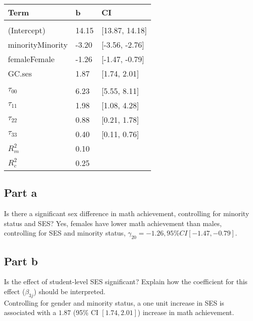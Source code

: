 \documentclass[]{article}
\begin{document}
\begin{table}[H]
\centering
\begin{tabular}{lll}
\toprule
Term & b & CI\\
\midrule
\addlinespace[0.3em]
\multicolumn{3}{l}{\textbf{Fixed}}\\
\hspace{1em}(Intercept) & 14.15 & [13.87, 14.18]\\
\hspace{1em}minorityMinority & -3.20 & [-3.56, -2.76]\\
\hspace{1em}femaleFemale & -1.26 & [-1.47, -0.79]\\
\hspace{1em}GC.ses & 1.87 & [1.74, 2.01]\\
\addlinespace[0.3em]
\multicolumn{3}{l}{\textbf{Random}}\\
\hspace{1em}$\tau_{00}$ & 6.23 & [5.55, 8.11]\\
\hspace{1em}$\tau_{11}$ & 1.98 & [1.08, 4.28]\\
\hspace{1em}$\tau_{22}$ & 0.88 & [0.21, 1.78]\\
\hspace{1em}$\tau_{33}$ & 0.40 & [0.11, 0.76]\\
$R^2_m$ & 0.10 & \\
$R^2_c$ & 0.25 & \\
\bottomrule
\end{tabular}
\end{table}

\subsection{Part a}\label{part-a-1}

Is there a significant sex difference in math achievement, controlling
for minority status and SES? Yes, females have lower math achievement
than males, controlling for SES and minority status,
\(\gamma_{20} = -1.26, 95\% CI [-1.47, -0.79]\).

\subsection{Part b}\label{part-b-1}

Is the effect of student-level SES significant? Explain how the
coefficient for this effect (\(\beta_{3j}\)) should be interpreted.\\
Controlling for gender and minority status, a one unit increase in SES
is associated with a \(1.87\) (95\% CI \([1.74, 2.01]\)) increase in
math achievement.
\end{document}
